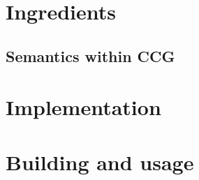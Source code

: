 \maketitle
\thispagestyle{empty}
\printtoc
\pagebreak


    
    

\pagebreak
\section{Ingredients}
    
    
    \subsection{Semantics within CCG}
        
        
        
    
    
\pagebreak
\section{Implementation}
    
    
    
    
    
\pagebreak
\section{Building and usage}
    

\pagebreak
\begin{appendices} \appendix
    
    
    
\end{appendices}

\pagebreak
\printbibliography[heading=bibintoc,title={References}]
